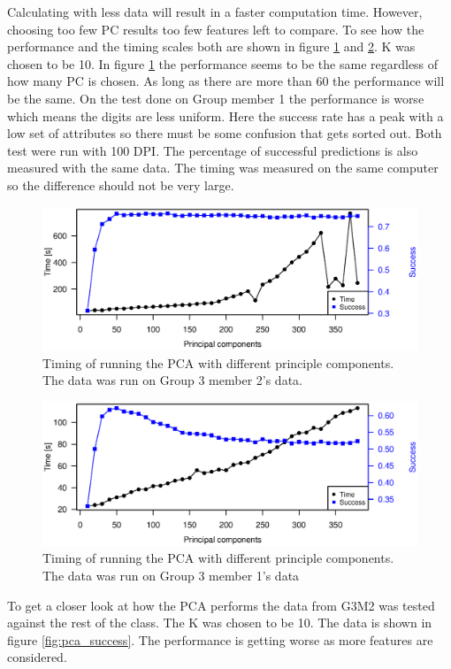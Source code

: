 Calculating with less data will result in a faster computation time.
However, choosing too few PC results too few features left to compare.
To see how the performance and the timing scales both are shown in figure \ref{fig:pca_timing_lukas} and \ref{fig:pca_timing_nikolaj}. K was chosen to be 10.
In figure \ref{fig:pca_timing_lukas} the performance seems to be the same regardless of how many PC is chosen. As long as there are more than 60 the performance will be the same.
On the test done on Group member 1 the performance is worse which means the digits are less uniform. 
Here the success rate has a peak with a low set of attributes so there must be some confusion that gets sorted out. 
Both test were run with 100 DPI. The percentage of successful predictions is also measured with the same data.
The timing was measured on the same computer so the difference should not be very large. 

\begin{figure}[H]
\centering
\includegraphics[width =0.8 \textwidth]{graphics/pca_timing}
\caption[Timing of PCA]{Timing of running the PCA with different principle components. 
The data was run on Group 3 member 2's data. 
}
\label{fig:pca_timing_lukas}
\end{figure}
\begin{figure}[H]
\centering
\includegraphics[width =0.8 \textwidth]{graphics/pca_timing_nikolaj}
\caption[Timing of PCA]{Timing of running the PCA with different principle components. 
The data was run on Group 3 member 1's data}
\label{fig:pca_timing_nikolaj}
\end{figure}

To get a closer look at how the PCA performs the data from G3M2 was tested against the rest of the class. 
The K was chosen to be 10. 
The data is shown in figure \ref{fig:pca_success}.
The performance is getting worse as more features are considered.

